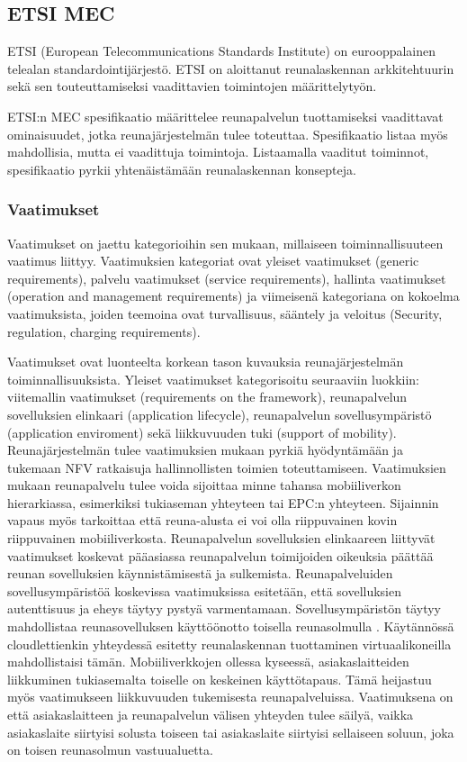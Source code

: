\subsection{ETSI MEC} 
ETSI (European Telecommunications Standards Institute) on eurooppalainen telealan standardointijärjestö.
ETSI on aloittanut reunalaskennan arkkitehtuurin sekä sen touteuttamiseksi vaadittavien toimintojen määrittelytyön.

ETSI:n MEC spesifikaatio määrittelee reunapalvelun tuottamiseksi vaadittavat ominaisuudet, jotka reunajärjestelmän tulee toteuttaa.
Spesifikaatio listaa myös mahdollisia, mutta ei vaadittuja toimintoja. 
Listaamalla vaaditut toiminnot, spesifikaatio pyrkii yhtenäistämään reunalaskennan konsepteja.  

\subsubsection{Vaatimukset} \label{etsi}
Vaatimukset on jaettu kategorioihin sen mukaan, millaiseen toiminnallisuuteen vaatimus liittyy.
Vaatimuksien kategoriat ovat yleiset vaatimukset (generic requirements), palvelu vaatimukset (service requirements), hallinta vaatimukset (operation and management requirements) ja viimeisenä kategoriana on kokoelma vaatimuksista, joiden teemoina ovat turvallisuus, sääntely ja veloitus (Security, regulation, charging requirements)\cite{etsitechreq}. 

Vaatimukset ovat luonteelta korkean tason kuvauksia reunajärjestelmän toiminnallisuuksista. Yleiset vaatimukset kategorisoitu seuraaviin luokkiin: viitemallin vaatimukset (requirements on the framework), reunapalvelun sovelluksien elinkaari (application lifecycle),
reunapalvelun sovellusympäristö (application enviroment) sekä liikkuvuuden tuki (support of mobility).
Reunajärjestelmän tulee vaatimuksien mukaan pyrkiä hyödyntämään ja tukemaan NFV ratkaisuja hallinnollisten toimien toteuttamiseen.
Vaatimuksien mukaan reunapalvelu tulee voida sijoittaa minne tahansa mobiiliverkon hierarkiassa, esimerkiksi tukiaseman yhteyteen tai EPC:n yhteyteen.
Sijainnin vapaus myös tarkoittaa että reuna-alusta ei voi olla riippuvainen kovin riippuvainen mobiiliverkosta. 
Reunapalvelun sovelluksien elinkaareen liittyvät vaatimukset koskevat pääasiassa reunapalvelun toimijoiden oikeuksia päättää reunan sovelluksien käynnistämisestä ja sulkemista.
Reunapalveluiden sovellusympäristöä koskevissa vaatimuksissa esitetään, että sovelluksien autenttisuus ja eheys täytyy pystyä varmentamaan. Sovellusympäristön täytyy mahdollistaa reunasovelluksen käyttöönotto toisella reunasolmulla \cite{etsitechreq}.
Käytännössä cloudlettienkin yhteydessä esitetty reunalaskennan tuottaminen virtuaalikoneilla mahdollistaisi tämän. 
Mobiiliverkkojen ollessa kyseessä, asiakaslaitteiden liikkuminen tukiasemalta toiselle on keskeinen käyttötapaus. Tämä heijastuu myös vaatimukseen liikkuvuuden tukemisesta reunapalveluissa.
Vaatimuksena on että asiakaslaitteen ja reunapalvelun välisen yhteyden tulee säilyä, vaikka asiakaslaite siirtyisi solusta toiseen tai asiakaslaite siirtyisi sellaiseen soluun, joka on toisen reunasolmun vastuualuetta.

